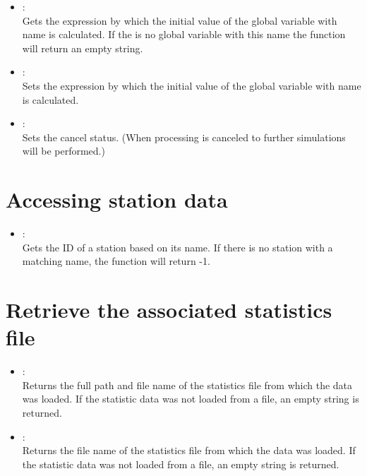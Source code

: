 \begin{itemize}
\item
{}:\\
Gets the expression by which the initial value of the global variable with
name  is calculated. If the is no global variable with
this name the function will return an empty string.

\item
{}:\\
Sets the expression by which the initial value of the global variable with
name  is calculated.

\item
{}:\\
Sets the cancel status. (When processing is canceled to further simulations will be performed.)

\end{itemize}

\section{Accessing station data}

\begin{itemize}

\item
{}:\\
Gets the ID of a station based on its name.
If there is no station with a matching name, the function will return -1.

\end{itemize}

\section{Retrieve the associated statistics file}

\begin{itemize}

\item
{}:\\
Returns the full path and file name of the statistics file from which the data was loaded.
If the statistic data was not loaded from a file, an empty string is returned.

\item
{}:\\
Returns the file name of the statistics file from which the data was loaded.
If the statistic data was not loaded from a file, an empty string is returned.

\end{itemize}



